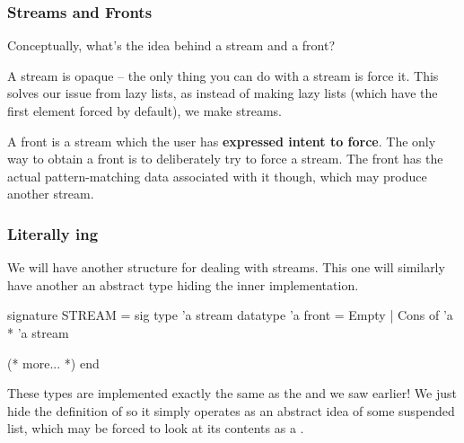 \documentclass[aspectratio=169, handout]{beamer}
\begin{document}
\begin{frame}[fragile]
  \frametitle{Streams and Fronts}

  \tgs

  Conceptually, what's the idea behind a stream and a front?

  \pause
  \vspace{\fill}

  \pause

  \pause
  \vspace{\fill}

  A stream is opaque -- the only thing you can do with a stream
  is force it. This solves our issue from lazy lists, as instead of making lazy
  lists (which have the first element forced by default), we make streams.

  \pause
  \vspace{\fill}

  A front is a stream which the user has \textbf{expressed intent to force}. The
  only way to obtain a front is to deliberately try to force a stream. The front
  has the actual pattern-matching data associated with it though, which may
  produce another stream.
\end{frame}

\begin{frame}[fragile]
  \frametitle{Literally ing}

  We will have another structure for dealing with streams. This one will similarly
  have another an abstract type hiding the inner implementation.

  \pause
  \vspace{\fill}

  \begin{codeblock}
    signature STREAM =
      sig
        type 'a stream
        datatype 'a front = Empty | Cons of 'a * 'a stream

        (* more... *)
      end
  \end{codeblock}

  \pause
  \vspace{\fill}

  These types are implemented exactly the same as the  and
   we saw earlier! We just hide the definition of 
  so it simply operates as an abstract idea of some suspended list, which may
  be forced to look at its contents as a .
\end{frame}
\end{document}
